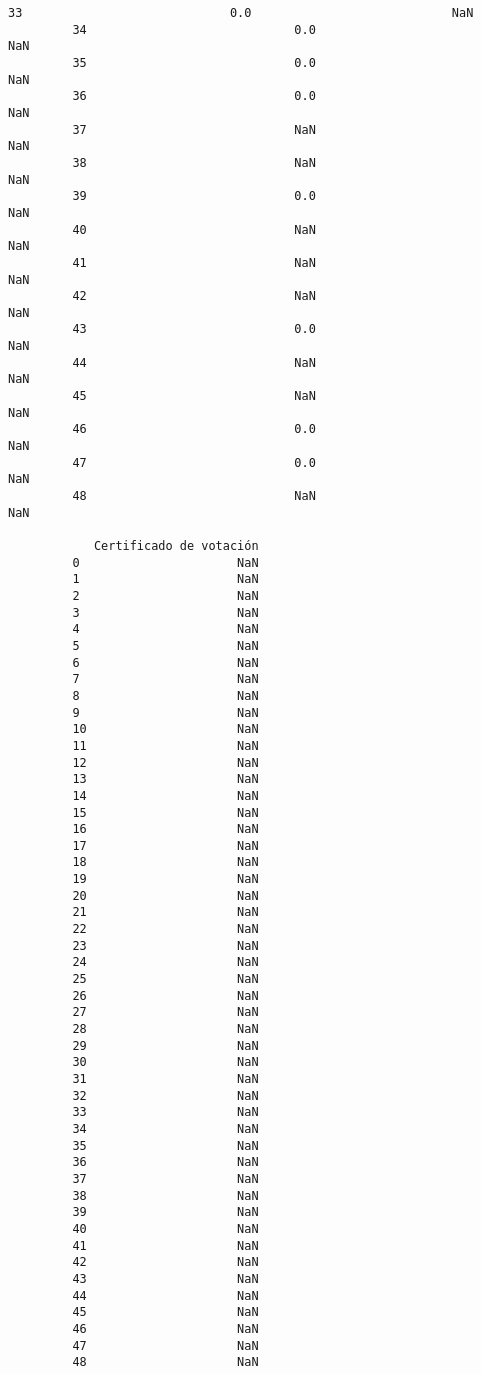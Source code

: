 \documentclass[11pt]{article}
\begin{document}
\begin{Verbatim}[commandchars=\\\{\}]
         33                             0.0                            NaN   
         34                             0.0                            NaN   
         35                             0.0                            NaN   
         36                             0.0                            NaN   
         37                             NaN                            NaN   
         38                             NaN                            NaN   
         39                             0.0                            NaN   
         40                             NaN                            NaN   
         41                             NaN                            NaN   
         42                             NaN                            NaN   
         43                             0.0                            NaN   
         44                             NaN                            NaN   
         45                             NaN                            NaN   
         46                             0.0                            NaN   
         47                             0.0                            NaN   
         48                             NaN                            NaN   
         
            Certificado de votación  
         0                      NaN  
         1                      NaN  
         2                      NaN  
         3                      NaN  
         4                      NaN  
         5                      NaN  
         6                      NaN  
         7                      NaN  
         8                      NaN  
         9                      NaN  
         10                     NaN  
         11                     NaN  
         12                     NaN  
         13                     NaN  
         14                     NaN  
         15                     NaN  
         16                     NaN  
         17                     NaN  
         18                     NaN  
         19                     NaN  
         20                     NaN  
         21                     NaN  
         22                     NaN  
         23                     NaN  
         24                     NaN  
         25                     NaN  
         26                     NaN  
         27                     NaN  
         28                     NaN  
         29                     NaN  
         30                     NaN  
         31                     NaN  
         32                     NaN  
         33                     NaN  
         34                     NaN  
         35                     NaN  
         36                     NaN  
         37                     NaN  
         38                     NaN  
         39                     NaN  
         40                     NaN  
         41                     NaN  
         42                     NaN  
         43                     NaN  
         44                     NaN  
         45                     NaN  
         46                     NaN  
         47                     NaN  
         48                     NaN  
\end{Verbatim}
            
\end{document}
